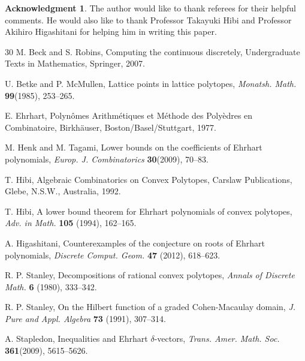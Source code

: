 \documentclass[12pt]{amsart}
\theoremstyle{definition}
\newtheorem*{acknowledgement}{Acknowledgment}
\theoremstyle{remark}
\numberwithin{equation}{section}
\begin{document}
\begin{acknowledgement}
	The author would like to thank referees for their helpful comments.
	He would also like to thank Professor Takayuki Hibi and Professor Akihiro Higashitani for helping him in writing this paper.
\end{acknowledgement}
	\begin{thebibliography}{30}
		M. Beck and S. Robins,
		Computing the continuous discretely,
		Undergraduate Texts in Mathematics, Springer, 2007.
		
		U. Betke and P. McMullen, Lattice points in lattice polytopes,
		\textit{Monatsh. Math.} \textbf{99}(1985), 253--265. 
		
		
		E. Ehrhart,
		Polyn\^{o}mes Arithm\'{e}tiques et M\'{e}thode des Poly\`{e}dres en Combinatoire,
		Birkh\"{a}user, Boston/Basel/Stuttgart, 1977.
		
		M. Henk and M. Tagami,
		Lower bounds on the coefficients of Ehrhart polynomials,
		\textit{Europ. J. Combinatorics} \textbf{30}(2009), 70--83.   
		
		T. Hibi,
		Algebraic Combinatorics on Convex Polytopes,
		Carslaw Publications, Glebe, N.S.W., Australia, 1992.
		
		T.  Hibi,
		A lower bound theorem for Ehrhart polynomials of convex polytopes,
		\textit{Adv. in Math.} \textbf{105} (1994), 162--165. 
		
		A. Higashitani,
		Counterexamples of the conjecture on roots of Ehrhart polynomials,
		\textit{Discrete Comput. Geom. } \textbf{47} (2012), 618--623. 
		
		
		R. P. Stanley,
		Decompositions of rational convex polytopes,
		\textit{Annals of Discrete Math. } \textbf{6} (1980), 333--342. 
		
		
		R. P. Stanley,
		On the Hilbert function of a graded Cohen-Macaulay domain,
		\textit{J. Pure and Appl.  Algebra} \textbf{73} (1991), 307--314. 
		
		
	
		A. Stapledon,
		Inequalities and Ehrhart $\delta$-vectors,
		\textit{Trans. Amer. Math. Soc.} \textbf{361}(2009), 5615--5626.   
		
		
	\end{thebibliography}
	
\end{document}
